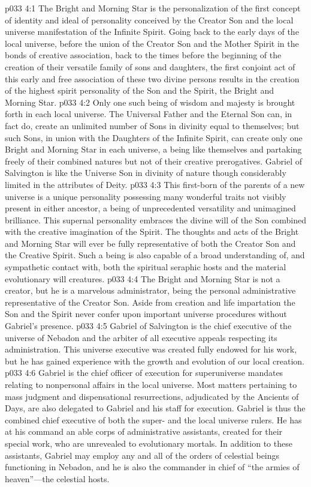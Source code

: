 \vs p033 4:1 The Bright and Morning Star is the personalization of the first concept of identity and ideal of personality conceived by the Creator Son and the local universe manifestation of the Infinite Spirit. Going back to the early days of the local universe, before the union of the Creator Son and the Mother Spirit in the bonds of creative association, back to the times before the beginning of the creation of their versatile family of sons and daughters, the first conjoint act of this early and free association of these two divine persons results in the creation of the highest spirit personality of the Son and the Spirit, the Bright and Morning Star.
\vs p033 4:2 Only one such being of wisdom and majesty is brought forth in each local universe. The Universal Father and the Eternal Son can, in fact do, create an unlimited number of Sons in divinity equal to themselves; but such Sons, in union with the Daughters of the Infinite Spirit, can create only one Bright and Morning Star in each universe, a being like themselves and partaking freely of their combined natures but not of their creative prerogatives. Gabriel of Salvington is like the Universe Son in divinity of nature though considerably limited in the attributes of Deity.
\vs p033 4:3 This first\hyp{}born of the parents of a new universe is a unique personality possessing many wonderful traits not visibly present in either ancestor, a being of unprecedented versatility and unimagined brilliance. This supernal personality embraces the divine will of the Son combined with the creative imagination of the Spirit. The thoughts and acts of the Bright and Morning Star will ever be fully representative of both the Creator Son and the Creative Spirit. Such a being is also capable of a broad understanding of, and sympathetic contact with, both the spiritual seraphic hosts and the material evolutionary will creatures.
\pc \vs p033 4:4 The Bright and Morning Star is not a creator, but he is a marvelous administrator, being the personal administrative representative of the Creator Son. Aside from creation and life impartation the Son and the Spirit never confer upon important universe procedures without Gabriel’s presence.
\vs p033 4:5 Gabriel of Salvington is the chief executive of the universe of Nebadon and the arbiter of all executive appeals respecting its administration. This universe executive was created fully endowed for his work, but he has gained experience with the growth and evolution of our local creation.
\vs p033 4:6 Gabriel is the chief officer of execution for superuniverse mandates relating to nonpersonal affairs in the local universe. Most matters pertaining to mass judgment and dispensational resurrections, adjudicated by the Ancients of Days, are also delegated to Gabriel and his staff for execution. Gabriel is thus the combined chief executive of both the super\hyp{} and the local universe rulers. He has at his command an able corps of administrative assistants, created for their special work, who are unrevealed to evolutionary mortals. In addition to these assistants, Gabriel may employ any and all of the orders of celestial beings functioning in Nebadon, and he is also the commander in chief of “the armies of heaven”---the celestial hosts.\plusone
